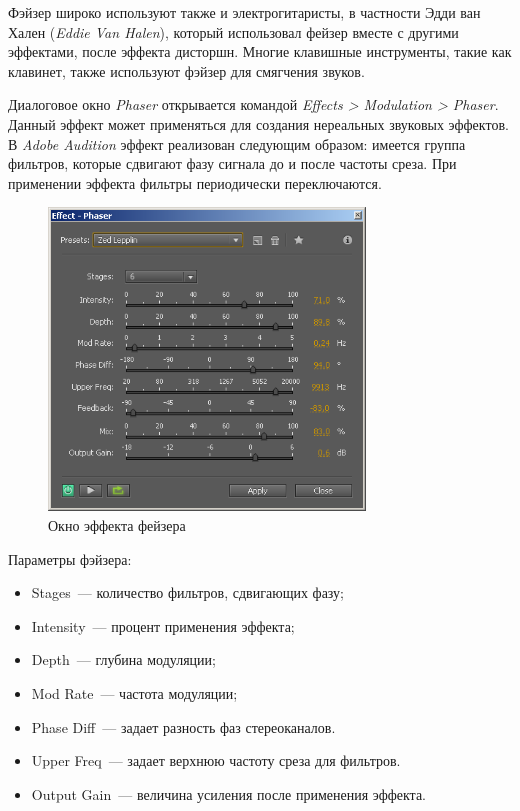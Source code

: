 \documentclass[oneside, final, 14pt]{extreport}
\begin{document}
Фэйзер широко используют также и электрогитаристы, в частности Эдди ван Хален (\textit{Eddie Van Halen}), который использовал фейзер вместе с другими эффектами, после эффекта дисторшн. Многие клавишные инструменты, такие как клавинет, также используют фэйзер для смягчения звуков.

Диалоговое окно \textit{Phaser} открывается командой \textit{Effects > Modulation > Phaser}. Данный эффект может применяться для создания нереальных звуковых эффектов.
В \textit{Adobe Audition} эффект реализован следующим образом: имеется группа фильтров, которые сдвигают фазу сигнала до и после частоты среза. При применении эффекта фильтры периодически переключаются.

\begin{figure}[h!]
  \centering
  \includegraphics[width=0.75\textwidth]{pic-auphaser-01}
  \caption{Окно эффекта фейзера}
  \label{pic-auphaser-01}
\end{figure}

Параметры фэйзера:
\begin{itemize}
  \item Stages~--- количество фильтров, сдвигающих фазу;
  \item Intensity~--- процент применения эффекта;
  \item Depth~--- глубина модуляции;
  \item Mod Rate~--- частота модуляции;
  \item Phase Diff~--- задает разность фаз стереоканалов.
  \item Upper Freq~--- задает верхнюю частоту среза для фильтров.
  \item Output Gain~--- величина усиления после применения эффекта.
\end{itemize}
\end{document}
